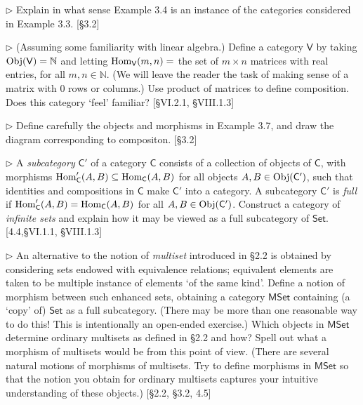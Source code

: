 \begin{problem}
  $\rhd$ Explain in what sense Example 3.4 is an instance of the categories
  considered in Example 3.3. [\S 3.2]
\end{problem}

\begin{problem}
  $\rhd$ (Assuming some familiarity with linear algebra.) Define a category
  $\mathsf{V}$ by taking $\mathrm{Obj}(\mathsf{V}) = \mathbb{N}$ and letting
  $\mathrm{Hom}_{\mathsf{V}}(m,n) = $ the set of $m\times n$ matrices with real
  entries, for all $m,n\in\mathbb{N}$. (We will leave the reader the task of
  making sense of a matrix with 0 rows or columns.) Use product of matrices
  to define composition. Does this category `feel' familiar?
  [\S VI.2.1, \S VIII.1.3]
\end{problem}

\begin{problem}
  $\rhd$ Define carefully the objects and morphisms in Example 3.7, and draw
  the diagram corresponding to compositon. [\S 3.2]
\end{problem}

\begin{problem}
  \def \C {\mathsf{C}}
  \def \Cp {\C'}

  $\rhd$ A \textit{subcategory} $\Cp$ of a category $\C$ consists of a
  collection of objects of $\C$, with morphisms $\Hom_\Cp(A,B) \subseteq
  \Hom_\C(A,B)$ for all objects $A,B\in\Obj(\Cp)$, such that identities and
  compositions in $\C$ make $\Cp$ into a category. A subcategory $\Cp$ is
  \textit{full} if $\Hom_\Cp(A,B) = \Hom_\C(A,B)$ for all $A,B\in\Obj(\Cp)$.
  Construct a category of \textit{infinite sets} and explain how it may be
  viewed as a full subcategory of $\mathsf{Set}$. [4.4,\S VI.1.1,
  \S VIII.1.3]
\end{problem}

\begin{problem}
  \def \Set {\mathsf{Set}}
  \def \MSet {\mathsf{MSet}}

  $\rhd$ An alternative to the notion of \textit{multiset} introduced in
  \S2.2 is obtained by considering sets endowed with equivalence relations;
  equivalent elements are taken to be multiple instance of elements `of the
  same kind'. Define a notion of morphism between such enhanced sets,
  obtaining a category $\MSet$ containing (a `copy' of) $\Set$ as a full
  subcategory. (There may be more than one reasonable way to do this!
  This is intentionally an open-ended exercise.) Which objects in $\MSet$
  determine ordinary multisets as defined in \S2.2 and how? Spell out what
  a morphism of multisets would be from this point of view. (There are
  several natural motions of morphisms of multisets. Try to define morphisms
  in $\MSet$ so that the notion you obtain for ordinary multisets captures
  your intuitive understanding of these objects.) [\S2.2, \S3.2, 4.5]
\end{problem}

